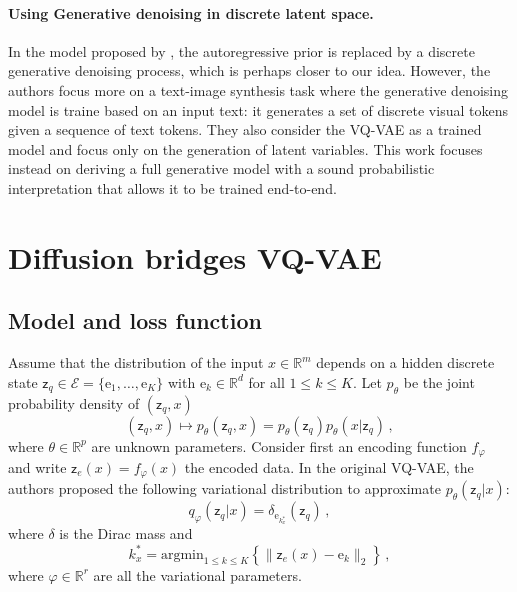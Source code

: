 \documentclass[nohyperref]{article}
\theoremstyle{plain}
\theoremstyle{definition}
\theoremstyle{remark}
\newcommand{\rset}{\mathbb{R}}
\newcommand{\latentcont}{\mathsf{z}_e}
\newcommand{\latentdis}{\mathsf{z}_q}
\newcommand{\rme}{\mathrm{e}}
\newcommand{\embedspace}{\mathcal{E}}
\newcommand{\embed}{\rme}
\begin{document}
\paragraph{Using Generative denoising in discrete latent space. }
In the model proposed by \cite{gu2021vector}, the autoregressive prior is replaced by a discrete generative denoising process, which is perhaps closer to our idea. However, the authors focus more on a text-image synthesis task where the generative denoising model is traine based on an input text: it generates a set of discrete visual tokens given a sequence of text tokens. They also consider the VQ-VAE as a trained model and focus only on the generation of latent variables. This work focuses instead on deriving a full generative model with a sound probabilistic interpretation that allows it to be trained end-to-end.

\section{Diffusion bridges VQ-VAE}
 \subsection{Model and loss function}
 Assume that the distribution of the input $x\in\rset^m$ depends on a hidden discrete state $\latentdis\in\embedspace = \{\embed_1,\ldots,\embed_K\}$ with $\embed_k\in\rset^d$ for all $1\leqslant k \leqslant K$. Let $p_\theta$ be the joint probability density of $(\latentdis,x)$%
 $$
 (\latentdis,x)\mapsto p_\theta(\latentdis,x) =  p_\theta(\latentdis) p_\theta(x|\latentdis)\,,
 $$
 where $\theta\in\rset^p$ are unknown parameters.
Consider first an encoding function $f_\varphi$ and write $\latentcont(x)= f_\varphi(x)$ the encoded data. In the original VQ-VAE, the authors proposed the following variational distribution to approximate $p_\theta(\latentdis|x)$:
 $$
  q_\varphi(\latentdis|x) = \delta_{\embed_{k^*_x}}(\latentdis)\,,
  $$
  where $\delta$ is the Dirac mass and
 $$
  k^*_x = \mathrm{argmin}_{1\leqslant k \leqslant K}\left\{\|\latentcont(x)-\embed_k\|_2\right\}\,,
 $$
  where $\varphi\in\rset^r$ are all the variational parameters.
\end{document}
